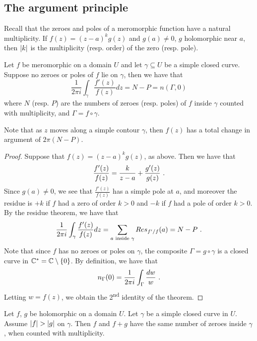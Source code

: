 \subsection{The argument principle}
Recall that the zeroes and poles of a meromorphic function have a natural multiplicity. If $f(z) = (z -a)^k g(z)$ and $g(a) \neq 0$, $g$ holomorphic near $a$, then $\lvert k\rvert$ is the multiplicity (resp. order) of the zero (resp. pole).

\begin{theorem}[name=Argument principle, key=thm:argument_principle]
 Let $f$ be meromorphic on a domain $U$ and let $\gamma \subseteq U$ be a simple closed curve.
Suppose no zeroes or poles of $f$ lie on $\gamma$, then we have that
\[
\frac{1}{2 \pi i} \int_\gamma \frac{f'(z)}{f(z)} dz = N - P = n(\Gamma, 0)
\]
where $N$ (resp. $P$) are the numbers of zeroes (resp. poles) of $f$ inside $\gamma$ counted with multiplicity, and $\Gamma = f \circ \gamma$.
\end{theorem}

Note that as $z$ moves along a simple contour $\gamma$, then $f(z)$ has a total change in argument of $2 \pi (N - P)$.

\begin{proof}
  Suppose that $f(z) = (z - a)^kg(z)$, as above. Then we have that
\[
\frac{f'(z)}{f(z)} = \frac{k}{z - a} + \frac{g'(z)}{g(z)} \ \text{.}
\]
Since $g(a) \neq 0$, we see that $\frac{f'(z)}{f(z)}$ has a simple pole at $a$, and moreover the residue is $+k$ if $f$ had a zero of order $k > 0$ and $-k$ if $f$ had a pole of order $k > 0$.
By the residue theorem, we have that
\[
\frac{1}{2 \pi i} \int_{\gamma} \frac{f'(z)}{f(z)} dz = \sum_{a \text{ inside } \gamma} Res_{f'/f}(a) = N - P \ \text{.}
\]
Note that since $f$ has no zeroes or poles on $\gamma$, the composite $\Gamma = g \circ \gamma$ is a closed curve in $\mathbb{C}^* = \mathbb{C} \setminus \{ 0 \}$.
By definition, we have that
\[
n_\Gamma(0) = \frac{1}{2 \pi i}\int_\Gamma \frac{dw}{w} \ \text{.}
\]
Letting $w = f(z)$, we obtain the 2\textsuperscript{nd} identity of the theorem.
\end{proof}

\begin{corollary}
  Let $f$, $g$ be holomorphic on a domain $U$.
Let $\gamma$ be a simple closed curve in $U$.
Assume $\lvert f\rvert > \lvert g\rvert$ on $\gamma$.
Then $f$ and $f + g$ have the same number of zeroes inside $\gamma$, when counted with multiplicity.
\end{corollary}

